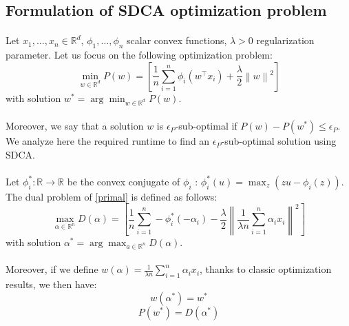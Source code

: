 \documentclass{article}
\newcommand{\norm}[1]{\left\|#1 \right\|}
\begin{document}
\subsection{Formulation of SDCA optimization problem}

\paragraph{}Let $x_1, \dots, x_n \in \mathbb{R}^d$, $\phi_1, \dots, \phi_n$ scalar convex functions, $\lambda > 0$ regularization parameter. Let us focus on the following optimization problem:
\begin{equation}
    \min_{w \in \mathbb{R}^d} P(w) = \left[ \dfrac{1}{n} \sum_{i=1}^n \phi_i(w^\top x_i) + \dfrac{\lambda}{2}\norm{w}^2 \right]
    \label{primal}
\end{equation}
with solution $w^{*} = \arg \min_{w \in \mathbb{R}^d} P(w)$.

\paragraph{}Moreover, we say that a solution $w$ is $\epsilon_P$-sub-optimal if $P(w) - P(w^{*}) \leq \epsilon_P$. We analyze here the required runtime to find an $\epsilon_P$-sub-optimal solution using SDCA.

\paragraph{}Let $\phi_i^{*} : \mathbb{R} \rightarrow \mathbb{R}$ be the convex conjugate of $\phi_i$ : $\phi_i^{*}(u) = \max_z (zu-\phi_i(z))$. The dual problem of \eqref{primal} is defined as follows:
\begin{equation}
    \max_{\alpha \in \mathbb{R}^n} D(\alpha) = \left[ \dfrac{1}{n} \sum_{i=1}^n -\phi_i^{*}(-\alpha_i) - \dfrac{\lambda}{2}\norm{\dfrac{1}{\lambda n}\sum_{i=1}^n \alpha_ix_i}^2 \right]
    \label{dual}
\end{equation}
with solution $\alpha^{*} = \arg \max_{a \in \mathbb{R}^n} D(\alpha)$.

\paragraph{}Moreover, if we define $w(\alpha) = \frac{1}{\lambda n} \sum_{i=1}^n \alpha_ix_i$, thanks to classic optimization results, we then have:
\begin{equation}
	w(\alpha^{*}) = w^{*}
\end{equation}
\begin{equation}
	P(w^{*}) = D(\alpha^{*})
\end{equation}
\end{document}

